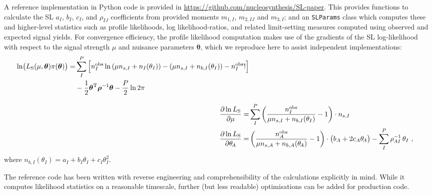 \documentclass[11pt]{article}
\begin{document}
A reference implementation in Python code is provided in
\url{https://github.com/nucleosynthesis/SL-paper}.  This provides functions to
calculate the SL $a_I$, $b_I$, $c_I$, and $\rho_{IJ}$ coefficients from provided
moments $m_{1,I}$, $m_{2,IJ}$ and $m_{3,I}$; and an \texttt{SLParams} class
which computes these and higher-level statistics such as profile likelihoods,
log likelihood-ratios, and related limit-setting measures computed using
observed and expected signal yields. For convergence efficiency, the profile
likelihood computation makes use of the gradients of the SL log-likelihood with
respect to the signal strength $\mu$ and nuisance parameters $\bm{\theta}$,
which we reproduce here to assist independent implementations:
%
\begin{align}
  \begin{split}
    \ln\! \big( L_{\rm{S}}(\mu,\bm{\theta} )\pi(\bm{\theta}) \big) =&
    \sum_I^P \Big[ n^{\rm{obs}}_{I} \ln \left(\mu n_{s,I} + n_{I}(\theta_{I}) \right) - \left( \mu n_{s,I} + n_{b,I}(\theta_{I}) \right) - n^{\rm{obs}}_{I}! \Big]\\
    &- \frac{1}{2} \bm{\theta}^\mathrm{T} \bm{\rho}^{-1} \bm{\theta} - \frac{P}{2} \ln 2\pi
  \end{split}\\[2ex]
  \frac{\partial\ln L_{\rm{S}}}{\partial\mu} =& \sum_I^P \left( \frac{n^{\rm{obs}}_I}{\mu n_{s,I} + n_{b,I}(\theta_{I})} - 1 \right) \cdot n_{s,I} \\
  \frac{\partial\ln L_{\rm{S}}}{\partial\theta_{\!A}} =& \left( \frac{n^{\rm{obs}}_A}{\mu n_{s,A} + n_{b,A}(\theta_{\!A}) } - 1 \right) \cdot \big( b_A + 2 c_A \theta_{\!A} \big) - \sum_I^P \rho_{\mspace{-1mu}AI}^{-1} \, \theta_I ~,
\label{eq:SL_LHC}
\end{align}
%
where $n_{b,I}(\theta_{I}) = a_{I} + b_{I}\theta_{I} + c_{I}\theta_{I}^{2}$.

The reference code has been written with reverse engineering and
comprehensibility of the calculations explicitly in mind. While it computes
likelihood statistics on a reasonable timescale, further (but less readable)
optimisations can be added for production code.





\end{document}

